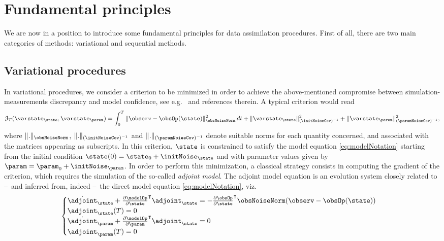 \documentclass{tufte-book}
\begin{document}
\section{Fundamental principles}

We are now in a position to introduce some fundamental principles for data assimilation procedures. First of all, there are two main categories of methods: variational and sequential methods.

\subsection{Variational procedures}

In variational procedures, we consider a criterion to be minimized in order to achieve the above-mentioned compromise between simulation-measurements discrepancy and model confidence, see e.g.~\cite{Bensoussan71,Chavent10} and references therein. A typical criterion would read
\begin{equation}\label{eq:varCriterion}
	\mathcal{J}_T(\varstate_\state,\varstate_{\param}) = \int_0^T \|\observ-\obsOp(\state)\|_{\obsNoiseNorm}^2 \, dt + \|\varstate_\state\|_{(\initNoiseCov)^{-1}}^2 + \|\varstate_{\param}\|_{(\paramNoiseCov)^{-1}}^2,
\end{equation}
where $\|.\|_{\obsNoiseNorm}$, $\|.\|_{(\initNoiseCov)^{-1}}$ and $\|.\|_{(\paramNoiseCov)^{-1}}$ denote suitable norms for each quantity concerned, and associated with the matrices appearing as subscripts. In this criterion, $\state$ is constrained to satisfy the model equation \eqref{eq:modelNotation} starting from the initial condition $\state(0)=\state_0+\initNoise_\state$ and with parameter values given by $\param=\param_0+\initNoise_\param$. In order to perform this minimization, a classical strategy consists in computing the gradient of the criterion, which requires the simulation of the so-called \emph{adjoint model}. The adjoint model equation is an evolution system closely related to --~and inferred from, indeed --~the direct model equation \eqref{eq:modelNotation}, viz.
\begin{equation}\label{eq:adjointPb}
	\begin{cases}
	\dot{\adjoint}_\state + \frac{\partial \modelOp}{\partial \state}^\intercal \adjoint_\state = -\frac{\partial \obsOp}{\partial \state}^\intercal\obsNoiseNorm(\observ-\obsOp(\state)) \\
	\adjoint_\state(T) = 0 \\
	\dot{\adjoint}_{\param} + \frac{\partial \modelOp}{\partial \param}^\intercal\adjoint_\state= 0 \\
	\adjoint_{\param}(T) = 0
	\end{cases}
\end{equation}
\end{document}
